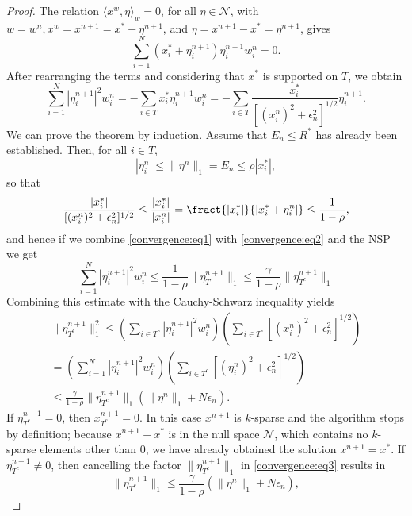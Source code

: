\documentclass[
  english,        %
  font=times,     %
  onecolumn,      %
]{tumarticle}
\numberwithin{equation}{section} %
\begin{document}
\begin{large}
\begin{adjustwidth}{0pt}{0pt}
\begin{proof}
The relation $\langle x^w, \eta \rangle_w = 0$, for all $\eta \in \mathcal{N}$, with $w = w^n, x^w = x^{n+1} = x^* + \eta^{n+1}$, and $\eta = x^{n+1} - x^* = \eta^{n+1}$, gives
\[ \sum_{i=1}^N (x_i^* + \eta_i^{n+1}) \eta_i^{n+1} w_i^n = 0.\]
After rearranging the terms and considering that $x^*$ is supported on $T$, we obtain
\begin{equation}
    \label{convergence:eq1} \sum_{i=1}^N |\eta_i^{n+1}|^2 w_i^n = -\sum_{i \in T} x_i^* \eta_i^{n+1} w_i^n = -\sum_{i \in T} \frac{x_i^*}{[(x_i^n)^2 + \epsilon_n^2]^{1/2}} \eta_i^{n+1}.
\end{equation}
We can prove the theorem by induction. Assume that $E_n \leq R^*$ has already been established. Then, for all $i \in T$,
\[ |\eta_i^n| \leq \lVert \eta^n \rVert_1 = E_n \leq \rho |x_i^*|,\]
so that
\begin{equation}
    \label{convergence:eq2} \frac{|x_i^*|}{[(x_i^n)^2 + \epsilon_n^2]^{1/2}} \leq \frac{|x_i^*|}{|x_i^n|} = \fract{|x_i^*|}{|x_i^* + \eta_i^n|} \leq \frac{1}{1-\rho},
\end{equation}
and hence if we combine \ref{convergence:eq1} with \ref{convergence:eq2} and the NSP we get
\[\sum_{i=1}^N |\eta_i^{n+1}|^2 w_i^n \leq \frac{1}{1-\rho} \lVert \eta_T^{n+1} \rVert_1 \leq \frac{\gamma}{1-\rho} \lVert \eta_{T^c}^{n+1} \rVert_1\]
Combining this estimate with the Cauchy-Schwarz inequality yields
\begin{equation}
\begin{split}
    \label{convergence:eq3}
    \lVert \eta_{T^c}^{n+1} \rVert_1^2 \leq (\sum_{i \in T^c} |\eta_i^{n+1}|^2 w_i^n) (\sum_{i \in T^c} [(x_i^n)^2 + \epsilon_n^2]^{1/2}) \\ = (\sum_{i = 1}^N |\eta_i^{n+1}|^2 w_i^n) (\sum_{i \in T^c} [(\eta_i^n)^2 + \epsilon_n^2]^{1/2}) \\ \leq \frac{\gamma}{1-\rho} \lVert \eta_{T^c}^{n+1} \rVert_1 (\lVert \eta^n \rVert_1 + N \epsilon_n).
\end{split}
\end{equation}
If $\eta_{T^c}^{n+1} = 0$, then $x_{T^c}^{n+1} = 0$. In this case $x^{n+1}$ is $k$-sparse and the algorithm stops by definition; because $x^{n+1} - x^*$ is in the null space $\mathcal{N}$, which contains no $k$-sparse elements other than 0, we have already obtained the solution $x^{n+1} = x^*$. If $\eta_{T^c}^{n+1} \neq 0$, then cancelling the factor $\lVert \eta_{T^c}^{n+1} \rVert_1$ in \ref{convergence:eq3} results in
\[\lVert \eta_{T^c}^{n+1} \rVert_1 \leq \frac{\gamma}{1-\rho} (\lVert \eta^n \rVert_1 + N \epsilon_n),\]

\end{proof}
\end{adjustwidth}
\end{large}
\end{document}
